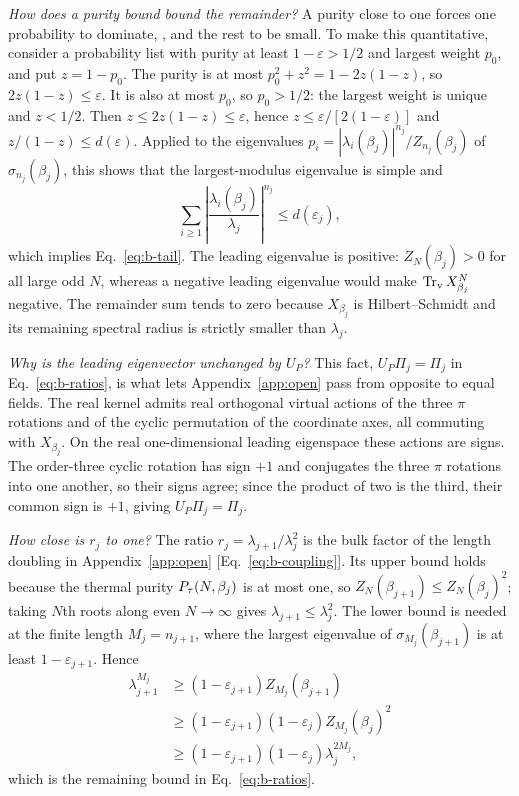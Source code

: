 \documentclass[aps,prl,reprint,amsmath,amssymb,nofootinbib,raggedbottom]{revtex4-2}
\begin{document}
\emph{How does a purity bound bound the remainder?} A purity close to one
forces one probability to dominate, , and the rest to be
small. To make this quantitative, consider a probability list with purity at
least $1-\varepsilon>1/2$ and largest weight $p_0$, and put $z=1-p_0$. The
purity is at most $p_0^2+z^2=1-2z(1-z)$, so $2z(1-z)\le\varepsilon$. It is also
at most $p_0$, so $p_0>1/2$: the largest weight is unique and $z<1/2$. Then
$z\le2z(1-z)\le\varepsilon$, hence $z\le\varepsilon/[2(1-\varepsilon)]$ and
$z/(1-z)\le d(\varepsilon)$. Applied to the eigenvalues
$p_i=|\lambda_i(\beta_j)|^{n_j}/Z_{n_j}(\beta_j)$ of $\sigma_{n_j}(\beta_j)$,
this shows that the largest-modulus eigenvalue is simple and
\begin{equation}
 \sum_{i\ge1}\left|\frac{\lambda_i(\beta_j)}{\lambda_j}\right|^{n_j}
 \le d(\varepsilon_j),
 \label{eq:b-full-tail}
\end{equation}
which implies Eq.~\eqref{eq:b-tail}. The leading eigenvalue is positive:
$Z_N(\beta_j)>0$ for all large odd $N$, whereas a negative leading eigenvalue
would make $\operatorname{Tr}_{\mathrm v} X_{\beta_j}^N$ negative. The remainder sum tends to zero
because $X_{\beta_j}$ is Hilbert--Schmidt and its remaining spectral radius is
strictly smaller than $\lambda_j$.

\emph{Why is the leading eigenvector unchanged by $U_P$?} This fact,
$U_P\Pi_j=\Pi_j$ in Eq.~\eqref{eq:b-ratios}, is what lets
Appendix~\ref{app:open} pass from opposite to equal fields. The real kernel
admits real orthogonal virtual actions of the three $\pi$ rotations and of the
cyclic permutation of the coordinate axes, all commuting with $X_{\beta_j}$. On
the real one-dimensional leading eigenspace these actions are signs. The
order-three cyclic rotation has sign $+1$ and conjugates the three $\pi$
rotations into one another, so their signs agree; since the product of two is
the third, their common sign is $+1$, giving $U_P\Pi_j=\Pi_j$.

\emph{How close is $r_j$ to one?} The ratio $r_j=\lambda_{j+1}/\lambda_j^2$ is
the bulk factor of the length doubling in Appendix~\ref{app:open}
[Eq.~\eqref{eq:b-coupling}]. Its upper bound holds because the thermal purity
$P_{\tau}(N,\beta_j)$ is at most one, so $Z_N(\beta_{j+1})\le Z_N(\beta_j)^2$;
taking $N$th roots along even $N\to\infty$ gives $\lambda_{j+1}\le\lambda_j^2$.
The lower bound is needed at the finite length $M_j=n_{j+1}$, where the largest
eigenvalue of $\sigma_{M_j}(\beta_{j+1})$ is at least $1-\varepsilon_{j+1}$.
Hence
\begin{align*}
 \lambda_{j+1}^{M_j}
 &\ge(1-\varepsilon_{j+1})Z_{M_j}(\beta_{j+1})\\
 &\ge(1-\varepsilon_{j+1})(1-\varepsilon_j)Z_{M_j}(\beta_j)^2\\
 &\ge(1-\varepsilon_{j+1})(1-\varepsilon_j)\lambda_j^{2M_j},
\end{align*}
which is the remaining bound in Eq.~\eqref{eq:b-ratios}.
\end{document}
